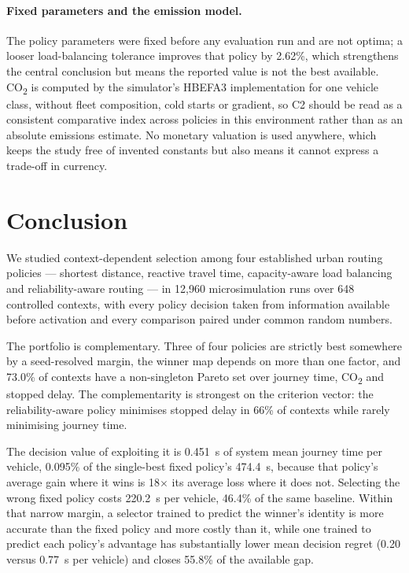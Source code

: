 \documentclass[runningheads]{llncs}
\newcommand{\CO}{CO\textsubscript{2}}
\begin{document}
\paragraph{Fixed parameters and the emission model.} The policy parameters were
fixed before any evaluation run and are not optima; a looser load-balancing
tolerance improves that policy by 2.62\%, which strengthens the
central conclusion but means the reported value is not the best available.
\CO{} is computed by the simulator's HBEFA3 implementation for one vehicle
class, without fleet composition, cold starts or gradient, so C2 should be read
as a consistent comparative index across policies in this environment rather
than as an absolute emissions estimate. No monetary valuation is used anywhere,
which keeps the study free of invented constants but also means it cannot
express a trade-off in currency.

\section{Conclusion}

We studied context-dependent selection among four established urban routing
policies --- shortest distance, reactive travel time, capacity-aware load
balancing and reliability-aware routing --- in 12{,}960 microsimulation
runs over 648 controlled contexts, with every policy decision taken
from information available before activation and every comparison paired under
common random numbers.

The portfolio is complementary. Three of four policies are strictly best
somewhere by a seed-resolved margin, the winner map depends on more than one
factor, and 73.0\% of contexts have a non-singleton Pareto set
over journey time, \CO{} and stopped delay. The complementarity is strongest on
the criterion vector: the reliability-aware policy minimises stopped delay in
66\% of contexts while rarely minimising journey time.

The decision value of exploiting it is 0.451~s of system mean journey
time per vehicle, 0.095\% of the single-best fixed policy's
474.4~s, because that policy's average gain where it wins is
18$\times$ its average loss where it does not. Selecting the wrong
fixed policy costs 220.2~s per vehicle, 46.4\%
of the same baseline. Within that narrow margin, a selector trained to predict
the winner's identity is more accurate than the fixed policy and more costly
than it, while one trained to predict each policy's advantage has substantially
lower mean decision regret (0.20 versus 0.77~s per
vehicle) and closes 55.8\% of the available gap.
\end{document}
